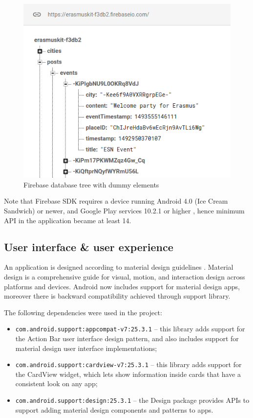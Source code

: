 \documentclass[runningheads,a4paper]{llncs}
\begin{document}
\begin{center}
	\begin{figure}
		\includegraphics[width = 4.8in]{img/firebase_db.png}
		\caption{Firebase database tree with dummy elements}
		\label{figure:firebase_db}
	\end{figure}	
\end{center}

Note that Firebase SDK requires a device running Android 4.0 (Ice Cream Sandwich)
or newer, and Google Play services 10.2.1 or higher \cite{firebase_sdk}, hence
minimum API in the application became at least 14.

\subsection{User interface \& user experience}

An application is designed according to material design guidelines \cite{material}.
Material design is a comprehensive guide for visual, motion, and interaction design
across platforms and devices. Android now includes support for material design apps,
moreover there is backward compatibility achieved through support library.

The following dependencies were used in the project:
\begin{itemize}
	\item \texttt{com.android.support:appcompat-v7:25.3.1} -- this library adds
		support for the Action Bar user interface design pattern, and also includes
		support for material design user interface implementations;
	\item \texttt{com.android.support:cardview-v7:25.3.1} -- this library adds
		support for the CardView widget, which lets show information inside cards
		that have a consistent look on any app;
	\item \texttt{com.android.support:design:25.3.1} -- the Design package provides
		APIs to support adding material design components and patterns to apps.
\end{itemize}
\end{document}
